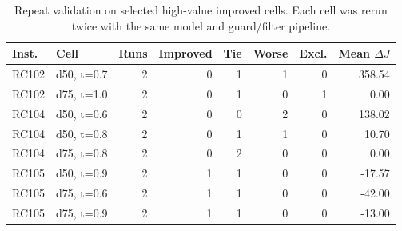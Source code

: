 \begin{table}[t]
\centering
\caption{Repeat validation on selected high-value improved cells. Each cell was rerun twice with the same model and guard/filter pipeline.}
\label{tab:repeat-validation}
\small
\begin{tabular}{llrrrrrr}
\toprule
Inst. & Cell & Runs & Improved & Tie & Worse & Excl. & Mean $\Delta J$ \\
\midrule
RC102 & d50, t=0.7 & 2 & 0 & 1 & 1 & 0 & 358.54 \\
RC102 & d75, t=1.0 & 2 & 0 & 1 & 0 & 1 & 0.00 \\
RC104 & d50, t=0.6 & 2 & 0 & 0 & 2 & 0 & 138.02 \\
RC104 & d50, t=0.8 & 2 & 0 & 1 & 1 & 0 & 10.70 \\
RC104 & d75, t=0.8 & 2 & 0 & 2 & 0 & 0 & 0.00 \\
RC105 & d50, t=0.9 & 2 & 1 & 1 & 0 & 0 & -17.57 \\
RC105 & d75, t=0.6 & 2 & 1 & 1 & 0 & 0 & -42.00 \\
RC105 & d75, t=0.9 & 2 & 1 & 1 & 0 & 0 & -13.00 \\
\bottomrule
\end{tabular}
\end{table}
